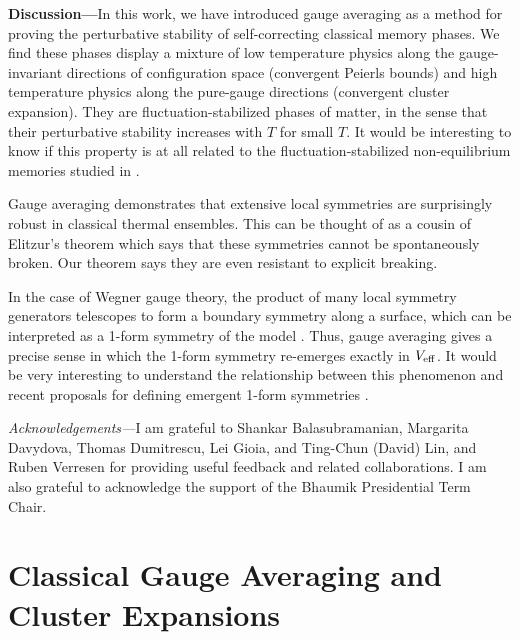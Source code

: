 \documentclass[prx,letterpaper,aps,superscriptaddress,floatfix,twocolumn,nofootinbib]{revtex4-2}
\theoremstyle{definition}
\begin{document}
\textbf{Discussion---}In this work, we have introduced gauge averaging as a method for proving the perturbative stability of self-correcting classical memory phases. We find these phases display a mixture of low temperature physics along the gauge-invariant directions of configuration space (convergent Peierls bounds) and high temperature physics along the pure-gauge directions (convergent cluster expansion). They are fluctuation-stabilized phases of matter, in the sense that their perturbative stability increases with $T$ for small $T$. It would be interesting to know if this property is at all related to the fluctuation-stabilized non-equilibrium memories studied in \cite{lake2026squeezingcodesrobustfluctuationstabilized}.

Gauge averaging demonstrates that extensive local symmetries are surprisingly robust in classical thermal ensembles. This can be thought of as a cousin of Elitzur's theorem \cite{elitzur} which says that these symmetries cannot be spontaneously broken. Our theorem says they are even resistant to explicit breaking.

In the case of Wegner gauge theory, the product of many local symmetry generators telescopes to form a boundary symmetry along a surface, which can be interpreted as a 1-form symmetry of the model \cite{Gaiotto_2015}. Thus, gauge averaging gives a precise sense in which the 1-form symmetry re-emerges exactly in $V_{\rm eff}$. It would be very interesting to understand the relationship between this phenomenon and recent proposals for defining emergent 1-form symmetries \cite{Pace_2023,serna2024worldsheetpatching1formsymmetries,liu2026informationtheoreticprincipleemergent1form}.




\textit{Acknowledgements---}I am grateful to Shankar Balasubramanian, Margarita Davydova, Thomas Dumitrescu, Lei Gioia, and Ting-Chun (David) Lin, and Ruben Verresen for providing useful feedback and related collaborations. I am also grateful to acknowledge the support of the Bhaumik Presidential Term Chair.



\appendix
{}

\onecolumngrid

\section{Classical Gauge Averaging and Cluster Expansions}
\end{document}
